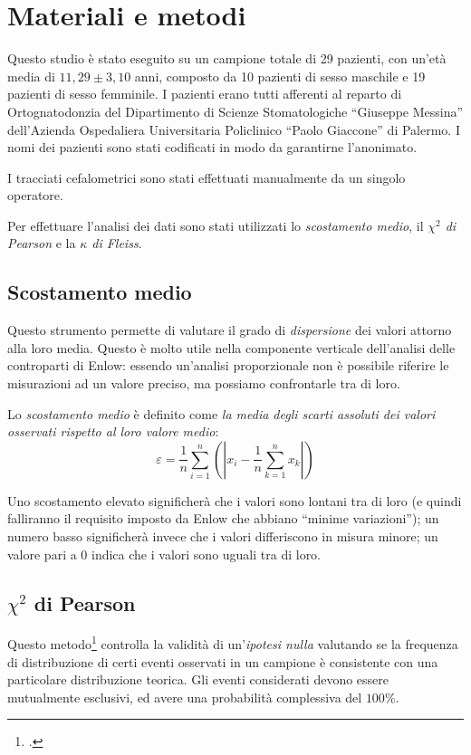 \chapter{Materiali e metodi}
Questo studio è stato eseguito su un campione totale di 29 pazienti, con un'età media di $11,29 \pm 3,10$ anni, composto da 10 pazienti di sesso maschile e 19 pazienti di sesso femminile. I pazienti erano tutti afferenti al reparto di Ortognatodonzia del Dipartimento di Scienze Stomatologiche ``Giuseppe Messina'' dell'Azienda Ospedaliera Universitaria Policlinico ``Paolo Giaccone'' di Palermo. I nomi dei pazienti sono stati codificati in modo da garantirne l'anonimato.

I tracciati cefalometrici sono stati effettuati manualmente da un singolo operatore. 

Per effettuare l'analisi dei dati sono stati utilizzati lo \emph{scostamento medio}, il \emph{$\chi^2$ di Pearson} e la \emph{$\kappa$ di Fleiss}.

\section{Scostamento medio}
\label{scostamento_medio}
Questo strumento permette di valutare il grado di \emph{dispersione} dei valori attorno alla loro media. Questo è molto utile nella componente verticale dell'analisi delle controparti di Enlow: essendo un'analisi proporzionale non è possibile riferire le misurazioni ad un valore preciso, ma possiamo confrontarle tra di loro.

Lo \emph{scostamento medio} è definito come \emph{la media degli scarti assoluti dei valori osservati rispetto al loro valore medio}:
\begin{equation}
\label{eq:scostamento_medio}
\varepsilon = \frac{1}{n}\sum_{i=1}^n{\left(\left|x_i - \frac{1}{n}\sum_{k=1}^n x_k\right|\right)}
\end{equation}

Uno scostamento elevato significherà che i valori sono lontani tra di loro (e quindi falliranno il requisito imposto da Enlow che abbiano ``minime variazioni''); un numero basso significherà invece che i valori differiscono in misura minore; un valore pari a 0 indica che i valori sono uguali tra di loro.

\section{$\chi^2$ di Pearson}
\label{sec:chi-square}
Questo metodo\footcite{Plackett1983} controlla la validità di un'\emph{ipotesi nulla} valutando se la frequenza di distribuzione di certi eventi osservati in un campione è consistente con una particolare distribuzione teorica. Gli eventi considerati devono essere mutualmente esclusivi, ed avere una probabilità complessiva del $100\%$. %

